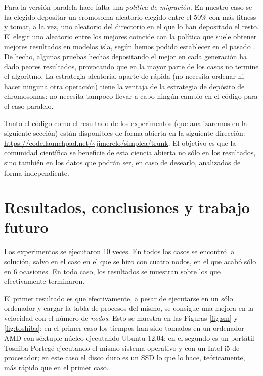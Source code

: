 \documentclass{article}
\begin{document}
Para la versión paralela hace falta una {\em política de
  migración}. En nuestro caso se ha elegido depositar un cromosoma      %
aleatorio elegido entre el 50\% con más fitness y tomar, a la vez, uno
aleatorio del directorio en el que lo han depositado el resto. El
elegir uno aleatorio entre los mejores coincide con la política que
suele obtener mejores resultados en modelos isla, según hemos podido
establecer en el pasado \cite{jj:2008:PPSN}. De hecho, algunas pruebas
hechas depositando el mejor en cada generación ha dado peores
resultados, provocando que en la mayor parte de los casos no termine
el algoritmo. La estrategia aleatoria, aparte de rápida (no necesita
ordenar ni hacer ninguna otra operación) tiene la ventaja de la
estrategia de depósito de chromosomas: no necesita tampoco llevar a
cabo ningún cambio en el código para el caso paralelo.

Tanto el código como el resultado de los experimentos (que
analizaremos en la siguiente sección) están disponibles de forma
abierta en la siguiente dirección:
\url{https://code.launchpad.net/\~jjmerelo/simplea/trunk}. El objetivo
es que la comunidad científica se beneficie de esta ciencia abierta no
sólo en los resultados, sino también en los datos que podrán ser, en
caso de desearlo, analizados de forma independiente. 

\section{Resultados, conclusiones y trabajo futuro}
\label{sec:res}

Los experimentos se ejecutaron 10 veces. En todos los casos se
encontró la solución, salvo en el caso en el que se hizo con cuatro
nodos, en el que acabó sólo en 6 ocasiones. En todo caso, los
resultados se muestran sobre los que efectivamente terminaron.

El primer resultado es que efectivamente, a pesar de ejecutarse en un
sólo ordenador y cargar la tabla de procesos del mismo, se consigue
una mejora en la velocidad con el número de {\em nodos}. Esto se
muestra en las Figuras \ref{fig:sm} y \ref{fig:toshiba}; en el primer
caso los tiempos han sido tomados en un ordenador AMD con séxtuple
núcleo ejecutando Ubuntu 12.04; en el segundo es un portátil Toshiba
Portegé ejecutando el mismo sistema operativo y con un Intel i5 de
procesador; en este caso el disco duro es un SSD lo que lo hace,
teóricamente, más rápido que en el primer caso.
\end{document}
